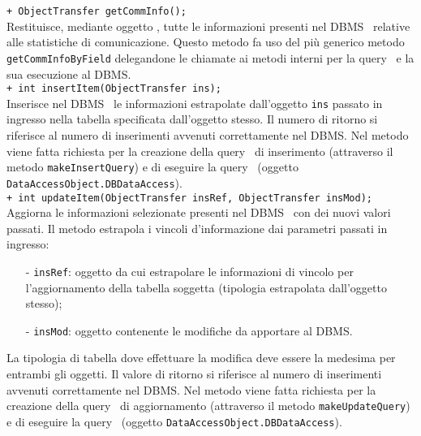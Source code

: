 {\begin{sloppypar}
{{{{\begin{itemize}
{				\texttt{+ ObjectTransfer getCommInfo();}\\
				Restituisce, mediante oggetto , tutte le informazioni presenti nel DBMS\g~ relative alle statistiche di comunicazione.
				Questo metodo fa uso del più generico metodo \texttt{getCommInfoByField} delegandone le chiamate ai metodi interni per la query\g~ e la sua esecuzione al DBMS\g.\\
				
				\texttt{+ int insertItem(ObjectTransfer ins);}\\
				Inserisce nel DBMS\g~ le informazioni estrapolate dall'oggetto  \texttt{ins} passato in ingresso nella tabella specificata dall'oggetto stesso.
				Il numero di ritorno si riferisce al numero di inserimenti avvenuti correttamente nel DBMS\g.
				Nel metodo viene fatta richiesta per la creazione della query\g~ di inserimento (attraverso il metodo  \texttt{makeInsertQuery}) e di eseguire la query\g~ (oggetto \texttt{DataAccessObject.DBDataAccess}).\\
				
				\texttt{+ int updateItem(ObjectTransfer insRef, ObjectTransfer insMod);}\\
				Aggiorna le informazioni selezionate presenti nel DBMS\g~ con dei nuovi valori passati.
				Il metodo estrapola i vincoli d'informazione dai parametri passati in ingresso:
				\begin{itemize}
					\item[-] \texttt{insRef}: oggetto da cui estrapolare le informazioni di vincolo per l'aggiornamento della tabella soggetta (tipologia estrapolata dall'oggetto stesso);
					\item[-] \texttt{insMod}: oggetto contenente le modifiche da apportare al DBMS\g.
				\end{itemize}
				La tipologia di tabella dove effettuare la modifica deve essere la medesima per entrambi gli oggetti.
				Il valore di ritorno si riferisce al numero di inserimenti avvenuti correttamente nel DBMS\g.
				Nel metodo viene fatta richiesta per la creazione della query\g~ di aggiornamento (attraverso il metodo  \texttt{makeUpdateQuery}) e di eseguire la query\g~ (oggetto \texttt{DataAccessObject.DBDataAccess}).\\
				
}
\end{itemize}}}}}
\end{sloppypar}}
